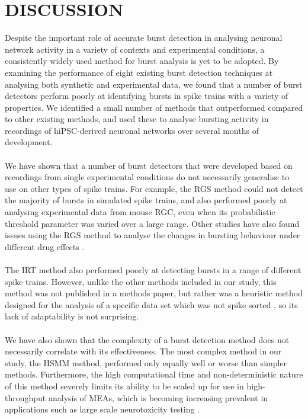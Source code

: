 \documentclass[12pt, titlepage]{article}
\begin{document}
	\section*{DISCUSSION}
	Despite the important role of accurate burst detection in analysing neuronal network activity in a variety of contexts and experimental conditions, a consistently widely used method for burst analysis is yet to be adopted. By examining the performance of eight existing burst detection techniques at analysing both synthetic and experimental data, we found that a number of burst detectors perform poorly at identifying bursts in spike trains with a variety of properties. We identified a small number of methods that outperformed compared to other existing methods, and used these to analyse bursting activity in recordings of hiPSC-derived neuronal networks over several months of development.
	\\ \\We have shown that a number of burst detectors that were developed based on recordings from single experimental conditions do not necessarily generalise to use on other types of spike trains. For example, the RGS method could not detect the majority of bursts in simulated spike trains, and also performed poorly at analysing experimental data from mouse RGC, even when its probabilistic threshold parameter was varied over a large range. Other studies have also found issues using the RGS method to analyse the changes in bursting behaviour under different drug effects \cite{Eisenman2015}. 
	\\ \\The IRT method also performed poorly at detecting bursts in a range of different spike trains. However, unlike the other methods included in our study, this method was not published in a methods paper, but rather was a heuristic method designed for the analysis of a specific data set which was not spike sorted \cite{Hennig2011}, so its lack of adaptability is not surprising.
	\\ \\We have also shown that the complexity of a burst detection method does not necessarily correlate with its effectiveness. The most complex method in our study, the HSMM method, performed only equally well or worse than simpler methods. Furthermore, the high computational time and non-deterministic nature of this method severely limits its ability to be scaled up for use in high-throughput analysis of MEAs, which is becoming increasing prevalent in applications such as large scale neurotoxicity testing \cite{Breier2008}.
\end{document}
